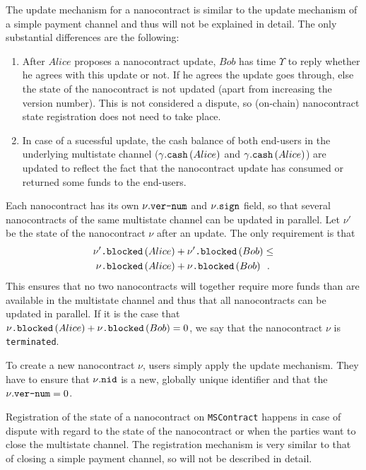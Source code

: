     The update mechanism for a nanocontract is similar to the update mechanism of a simple
    payment channel and thus will not be explained in detail. The only substantial
    differences are the following:
    \begin{enumerate}
      \item After $Alice$ proposes a nanocontract update, $Bob$ has time $\Upsilon$ to
      reply whether he agrees with this update or not. If he agrees the update goes
      through, else the state of the nanocontract is not updated (apart from increasing
      the version number). This is not considered a dispute, so (on-chain) nanocontract
      state registration does not need to take place.
      \item In case of a sucessful update, the cash balance of both end-users in the
      underlying multistate channel ($\gamma\mbox{.\texttt{cash}}\left(Alice\right)$ and
      $\gamma\mbox{.\texttt{cash}}\left(Alice\right)$) are updated to reflect the fact
      that the nanocontract update has consumed or returned some funds to the end-users.
    \end{enumerate}

    Each nanocontract has its own $\nu\mbox{.\texttt{ver-num}}$ and
    $\nu\mbox{.\texttt{sign}}$ field, so that several nanocontracts of the same multistate
    channel can be updated in parallel. Let $\nu'$ be the state of the nanocontract $\nu$
    after an update. The only requirement is that
    \begin{align*}
      \nu'\mbox{\texttt{.blocked}}\left(Alice\right) &+
      \nu'\mbox{\texttt{.blocked}}\left(Bob\right) \leq \\
      \nu\mbox{\texttt{.blocked}}\left(Alice\right) &+
      \nu\mbox{\texttt{.blocked}}\left(Bob\right) \enspace.
    \end{align*}
    This ensures that no two nanocontracts will together require more funds than are
    available in the multistate channel and thus that all nanocontracts can be updated in
    parallel. If it is the case that $\nu\mbox{\texttt{.blocked}}\left(Alice\right) +
    \nu\mbox{\texttt{.blocked}}\left(Bob\right) = 0$, we say that the nanocontract $\nu$
    is \texttt{terminated}.

    To create a new nanocontract $\nu$, users simply apply the update mechanism. They have
    to ensure that $\nu\mbox{.\texttt{nid}}$ is a new, globally unique identifier and that
    the $\nu\mbox{.\texttt{ver-num}} = 0$.

    Registration of the state of a nanocontract on \texttt{MSContract} happens in case of
    dispute with regard to the state of the nanocontract or when the parties want to close
    the multistate channel. The registration mechanism is very similar to that of closing
    a simple payment channel, so will not be described in detail.


